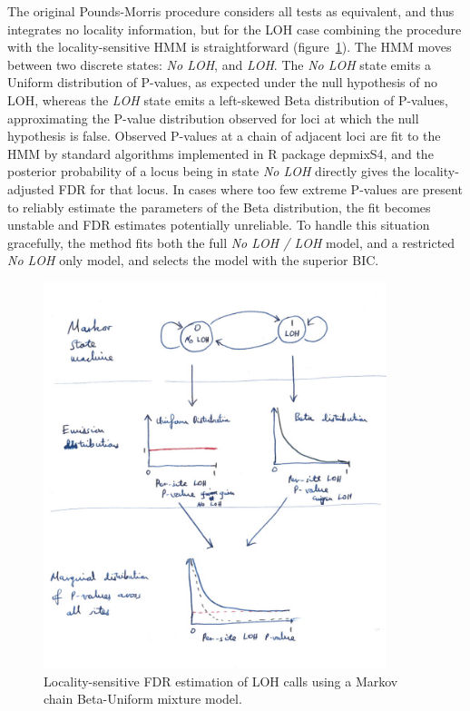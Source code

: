 \documentclass[dissertation.tex]{subfiles}
\begin{document}
The original Pounds-Morris procedure considers all tests as equivalent, and thus integrates no locality information, but for the \gls{LOH} case combining the procedure with the locality-sensitive \gls{HMM} is straightforward (figure~\ref{fig:comp_loh_hmm}).  The \gls{HMM} moves between two discrete states: \emph{No LOH}, and \emph{LOH}.  The \emph{No LOH} state emits a Uniform distribution of P-values, as expected under the null hypothesis of no \gls{LOH}, whereas the \emph{LOH} state emits a left-skewed Beta distribution of P-values, approximating the P-value distribution observed for loci at which the null hypothesis is false.  Observed P-values at a chain of adjacent loci are fit to the \gls{HMM} by standard algorithms implemented in R package depmixS4, and the posterior probability of a locus being in state \emph{No LOH} directly gives the locality-adjusted \gls{FDR} for that locus.  In cases where too few extreme P-values are present to reliably estimate the parameters of the Beta distribution, the fit becomes unstable and \gls{FDR} estimates potentially unreliable.  To handle this situation gracefully, the method fits both the full \emph{No LOH / LOH} model, and a restricted \emph{No LOH} only model, and selects the model with the superior \gls{BIC}.
\begin{figure}[!htbp]
\centering
\includegraphics[width=100mm]{resources/comp_loh_hmm.jpg}
\caption{Locality-sensitive FDR estimation of LOH calls using a Markov chain Beta-Uniform mixture model.\label{fig:comp_loh_hmm}}
\end{figure}
\end{document}
